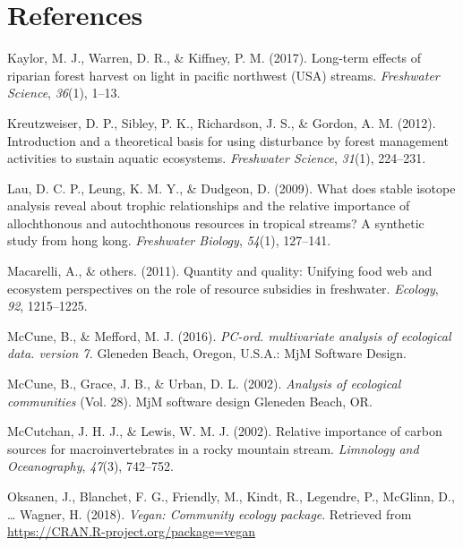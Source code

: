 \documentclass[double,12pt]{beavtex}
\begin{document}
  \pagebreak
  
  \chapter*{References}\label{references}
  
  \hypertarget{refs}{}
  \hypertarget{ref-Kaylor2017}{}
  Kaylor, M. J., Warren, D. R., \& Kiffney, P. M. (2017). Long-term
  effects of riparian forest harvest on light in pacific northwest (USA)
  streams. \emph{Freshwater Science}, \emph{36}(1), 1--13.
  
  \hypertarget{ref-Kreutzweiser2012}{}
  Kreutzweiser, D. P., Sibley, P. K., Richardson, J. S., \& Gordon, A. M.
  (2012). Introduction and a theoretical basis for using disturbance by
  forest management activities to sustain aquatic ecosystems.
  \emph{Freshwater Science}, \emph{31}(1), 224--231.
  
  \hypertarget{ref-Lau2009}{}
  Lau, D. C. P., Leung, K. M. Y., \& Dudgeon, D. (2009). What does stable
  isotope analysis reveal about trophic relationships and the relative
  importance of allochthonous and autochthonous resources in tropical
  streams? A synthetic study from hong kong. \emph{Freshwater Biology},
  \emph{54}(1), 127--141.
  
  \hypertarget{ref-Macarelli2011}{}
  Macarelli, A., \& others. (2011). Quantity and quality: Unifying food
  web and ecosystem perspectives on the role of resource subsidies in
  freshwater. \emph{Ecology}, \emph{92}, 1215--1225.
  
  \hypertarget{ref-PC-ORD}{}
  McCune, B., \& Mefford, M. J. (2016). \emph{PC-ord. multivariate
  analysis of ecological data. version 7.} Gleneden Beach, Oregon, U.S.A.:
  MjM Software Design.
  
  \hypertarget{ref-McCune2002}{}
  McCune, B., Grace, J. B., \& Urban, D. L. (2002). \emph{Analysis of
  ecological communities} (Vol. 28). MjM software design Gleneden Beach,
  OR.
  
  \hypertarget{ref-McCutchan2002}{}
  McCutchan, J. H. J., \& Lewis, W. M. J. (2002). Relative importance of
  carbon sources for macroinvertebrates in a rocky mountain stream.
  \emph{Limnology and Oceanography}, \emph{47}(3), 742--752.
  
  \hypertarget{ref-vegan}{}
  Oksanen, J., Blanchet, F. G., Friendly, M., Kindt, R., Legendre, P.,
  McGlinn, D., \ldots{} Wagner, H. (2018). \emph{Vegan: Community ecology
  package}. Retrieved from \url{https://CRAN.R-project.org/package=vegan}
  
\end{document}
